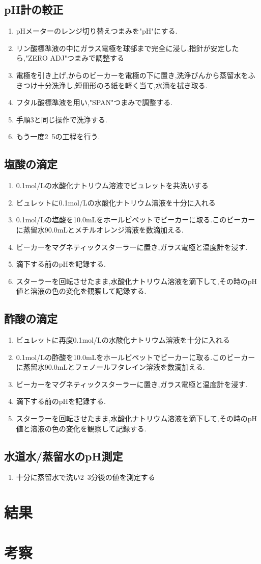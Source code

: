 \documentclass[a4j,10pt,dvipdfmx]{jarticle}
\begin{document}
\subsection{pH計の較正}
\begin{enumerate}
  \item pHメーターのレンジ切り替えつまみを"pH"にする.
  \item リン酸標準液の中にガラス電極を球部まで完全に浸し,指針が安定したら,"ZERO ADJ"つまみで調整する
  \item 電極を引き上げ,からのビーカーを電極の下に置き,洗浄びんから蒸留水をふきつけ十分洗浄し,短冊形のろ紙を軽く当て,水滴を拭き取る.
  \item フタル酸標準液を用い,"SPAN"つまみで調整する.
  \item 手順3と同じ操作で洗浄する.
  \item もう一度2~5の工程を行う.
\end{enumerate}
\subsection{塩酸の滴定}
\begin{enumerate}
  \item 0.1mol/Lの水酸化ナトリウム溶液でビュレットを共洗いする
  \item ビュレットに0.1mol/Lの水酸化ナトリウム溶液を十分に入れる
  \item 0.1mol/Lの塩酸を10.0mLをホールピペットでビーカーに取る.このビーカーに蒸留水90.0mLとメチルオレンジ溶液を数滴加える.
  \item ビーカーをマグネティックスターラーに置き,ガラス電極と温度計を浸す.
  \item 滴下する前のpHを記録する.
  \item スターラーを回転させたまま,水酸化ナトリウム溶液を滴下して,その時のpH値と溶液の色の変化を観察して記録する.
\end{enumerate}
\subsection{酢酸の滴定}
\begin{enumerate}
  \item ビュレットに再度0.1mol/Lの水酸化ナトリウム溶液を十分に入れる
  \item 0.1mol/Lの酢酸を10.0mLをホールピペットでビーカーに取る.このビーカーに蒸留水90.0mLとフェノールフタレイン溶液を数滴加える.
  \item ビーカーをマグネティックスターラーに置き,ガラス電極と温度計を浸す.
  \item 滴下する前のpHを記録する.
  \item スターラーを回転させたまま,水酸化ナトリウム溶液を滴下して,その時のpH値と溶液の色の変化を観察して記録する.
\end{enumerate}
\subsection{水道水/蒸留水のpH測定}
\begin{enumerate}
  \item 十分に蒸留水で洗い2~3分後の値を測定する
\end{enumerate}
\section{結果}
  
\section{考察}
\end{document}
